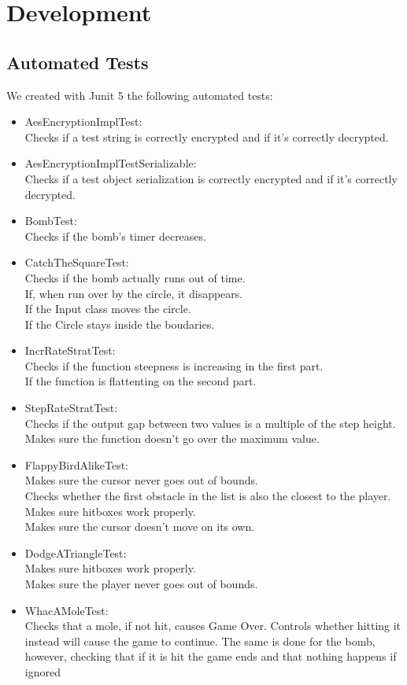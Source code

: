 \documentclass[a4paper,12pt]{report}
\begin{document}
\chapter{Development}
\section{Automated Tests}
We created with Junit 5 the following automated tests:
\begin{itemize}
	\item AesEncryptionImplTest:\\
	      Checks if a test string is correctly encrypted and if it's correctly decrypted.
	\item AesEncryptionImplTestSerializable:\\
	      Checks if a test object serialization is correctly encrypted and if it's correctly decrypted.
	\item BombTest:\\
	      Checks if the bomb's timer decreases.
	\item CatchTheSquareTest:\\
	      Checks if the bomb actually runs out of time.\\If, when run over by the circle, it disappears.\\ If the Input class moves the circle. \\ If the Circle stays inside the boudaries.
	\item IncrRateStratTest:\\
	      Checks if the function steepness is increasing in the first part.\\ If the function is flattenting on the second part.
	\item StepRateStratTest:\\
	      Checks if the output gap between two values is a multiple of the step height.\\ Makes sure the function doesn't go over the maximum value.
	\item FlappyBirdAlikeTest:\\
	      Makes sure the cursor never goes out of bounds.\\ Checks whether the first obstacle in the list is also the closest to the player.\\ Makes sure hitboxes work properly.\\ Makes sure the cursor doesn't move on its own.
	\item DodgeATriangleTest:\\
	      Makes sure hitboxes work properly.\\ Makes sure the player never goes out of bounds.
	\item WhacAMoleTest: \\
	      Checks that a mole, if not hit, causes Game Over. Controls whether hitting it instead will cause the game to continue. The same is done for the bomb, however, checking that if it is hit the game ends and that nothing happens if ignored

\end{itemize}
\end{document}
